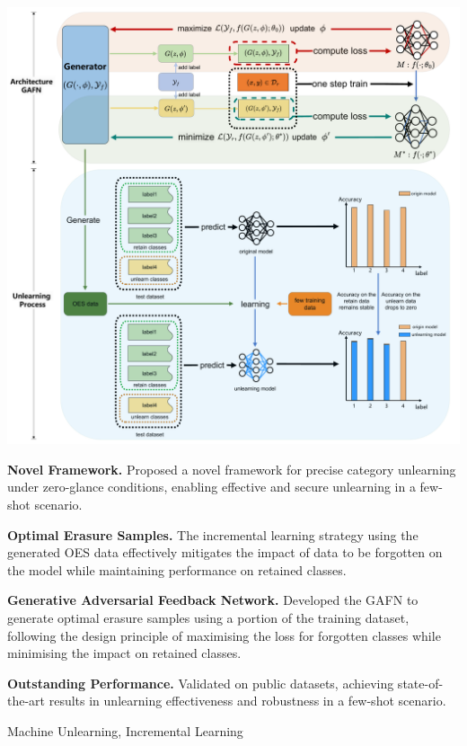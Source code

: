 \documentclass[preprint,12pt]{elsarticle}
\begin{document}
\begin{frontmatter}
\begin{abstract}
\end{abstract}

\begin{graphicalabstract}
\includegraphics[width=\linewidth]{abstract.pdf}
\end{graphicalabstract}

\begin{highlights}
\item \textbf{Novel Framework.}
Proposed a novel framework for precise category unlearning under zero-glance conditions, enabling effective and secure unlearning in a few-shot scenario.

\item \textbf{Optimal Erasure Samples.}
The incremental learning strategy using the generated OES data effectively mitigates the impact of data to be forgotten on the model while maintaining performance on retained classes.
    
\item \textbf{Generative Adversarial Feedback Network.}
Developed the GAFN to generate optimal erasure samples using a portion of the training dataset, following the design principle of maximising the loss for forgotten classes while minimising the impact on retained classes.

\item \textbf{Outstanding Performance.}
Validated on public datasets, achieving state-of-the-art results in unlearning effectiveness and robustness in a few-shot scenario.

\end{highlights}

\begin{keyword}
Machine Unlearning, Incremental Learning
\end{keyword}


\end{frontmatter}
\end{document}
